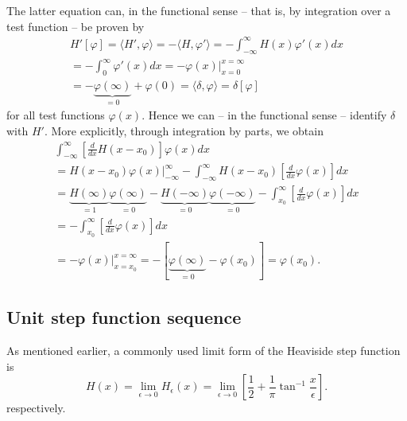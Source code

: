 {\color{OliveGreen}
\bproof
The latter equation can, in the functional sense -- that is, by integration over a test function --
be proven by
\begin{equation}
\begin{split}
H'[\varphi ]= \langle   H' , \varphi   \rangle = - \langle  H ,  \varphi'   \rangle
 =
-\int_{-\infty}^\infty H(x) \varphi' (x)  dx \\
 =
-\int_{0}^\infty  \varphi' (x)  dx
  =
-\left.   \varphi  (x) \right|_{x=0}^{x= \infty} \\
  =
 -   \underbrace{\varphi  (\infty)}_{=0} +  \varphi  (0)
  =    \langle   \delta , \varphi  \rangle  =\delta [\varphi ]
\end{split}
\end{equation}
for all test functions $\varphi (x)$. Hence we can -- in the functional sense  -- identify $\delta$ with $H'$.
More explicitly, through integration by parts, we obtain
\begin{equation}
\begin{split}
\int _{-\infty}^\infty \left[\frac{d}{dx} H(x-x_0)\right] \varphi (x) dx       \\
  =
\left. H(x-x_0) \varphi (x)\right| _{-\infty}^\infty - \int _{-\infty}^\infty H(x-x_0) \left[\frac{d}{dx} \varphi (x)\right] dx \\
  =
\underbrace{H(\infty)}_{=1}\underbrace{\varphi(\infty)}_{=0} - \underbrace{H(-\infty)}_{=0}\underbrace{\varphi(-\infty)}_{=0}
   - \int _{x_0}^\infty \left[\frac{d}{dx} \varphi (x)\right] dx  \\
 =  - \int _{x_0}^\infty \left[\frac{d}{dx} \varphi (x)\right] dx \\
 =    -  \left.  \varphi (x)   \right| _{x=x_0}^{x= \infty}
 =    - [  \underbrace{\varphi  (\infty)}_{=0}  - \varphi (x_0)]
 =     \varphi (x_0).
\end{split}
\end{equation}



\eproof
}

\subsection{Unit step function sequence}


As mentioned earlier, a commonly used limit form  of the Heaviside step function is
\begin{equation}
H(x)= \lim_{\epsilon \rightarrow 0} H_\epsilon (x)=\lim_{\epsilon \rightarrow 0}   \left[ \frac{1 }{2} + \frac{1 }{\pi} \tan^{-1}  \frac{x}{\epsilon } \right] .
\end{equation}
respectively.

